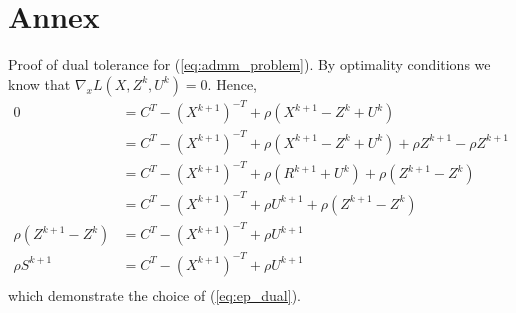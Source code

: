 \section{Annex}

Proof of dual tolerance for (\ref{eq:admm_problem}). By optimality conditions we know that $\nabla_x L(X,Z^{k},U^{k}) = 0$. Hence,
\begin{align*}
0 &= C^T - (X^{k+1})^{-T} + \rho(X^{k+1}-Z^k+U^k) \\
 &= C^T - (X^{k+1})^{-T} + \rho(X^{k+1}-Z^k+U^k)+\rho Z^{k+1}-\rho Z^{k+1}  \\
&= C^T - (X^{k+1})^{-T} + \rho(R^{k+1}+U^k)+\rho (Z^{k+1}-Z^{k}) \\
&= C^T - (X^{k+1})^{-T} + \rho U^{k+1}+\rho (Z^{k+1}-Z^{k}) \\
\rho(Z^{k+1}-Z^{k})&= C^T - (X^{k+1})^{-T} + \rho U^{k+1}  \\
\rho S^{k+1}&= C^T - (X^{k+1})^{-T} + \rho U^{k+1}  \\
\end{align*}
which demonstrate the choice of (\ref{eq:ep_dual}).
